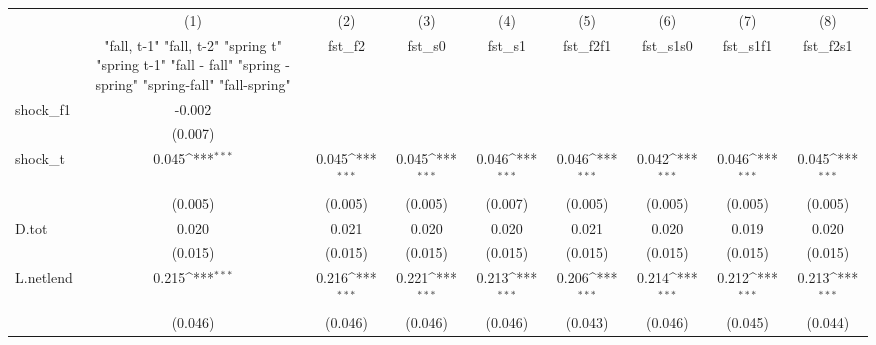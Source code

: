 {
\def\sym#1{\ifmmode^{#1}\else\(^{#1}\)\fi}
\begin{tabular}{l*{8}{c}}
\toprule
            &\multicolumn{1}{c}{(1)}&\multicolumn{1}{c}{(2)}&\multicolumn{1}{c}{(3)}&\multicolumn{1}{c}{(4)}&\multicolumn{1}{c}{(5)}&\multicolumn{1}{c}{(6)}&\multicolumn{1}{c}{(7)}&\multicolumn{1}{c}{(8)}\\
            &\multicolumn{1}{c}{  "fall, t-1" "fall, t-2" "spring t" "spring t-1"  "fall - fall" "spring - spring" "spring-fall" "fall-spring" }&\multicolumn{1}{c}{fst\_f2}&\multicolumn{1}{c}{fst\_s0}&\multicolumn{1}{c}{fst\_s1}&\multicolumn{1}{c}{fst\_f2f1}&\multicolumn{1}{c}{fst\_s1s0}&\multicolumn{1}{c}{fst\_s1f1}&\multicolumn{1}{c}{fst\_f2s1}\\
\midrule
shock\_f1    &      -0.002         &                     &                     &                     &                     &                     &                     &                     \\
            &     (0.007)         &                     &                     &                     &                     &                     &                     &                     \\
\addlinespace
shock\_t     &       0.045\sym{***}&       0.045\sym{***}&       0.045\sym{***}&       0.046\sym{***}&       0.046\sym{***}&       0.042\sym{***}&       0.046\sym{***}&       0.045\sym{***}\\
            &     (0.005)         &     (0.005)         &     (0.005)         &     (0.007)         &     (0.005)         &     (0.005)         &     (0.005)         &     (0.005)         \\
\addlinespace
D.tot       &       0.020         &       0.021         &       0.020         &       0.020         &       0.021         &       0.020         &       0.019         &       0.020         \\
            &     (0.015)         &     (0.015)         &     (0.015)         &     (0.015)         &     (0.015)         &     (0.015)         &     (0.015)         &     (0.015)         \\
\addlinespace
L.netlend   &       0.215\sym{***}&       0.216\sym{***}&       0.221\sym{***}&       0.213\sym{***}&       0.206\sym{***}&       0.214\sym{***}&       0.212\sym{***}&       0.213\sym{***}\\
            &     (0.046)         &     (0.046)         &     (0.046)         &     (0.046)         &     (0.043)         &     (0.046)         &     (0.045)         &     (0.044)         \\

\end{tabular}}
